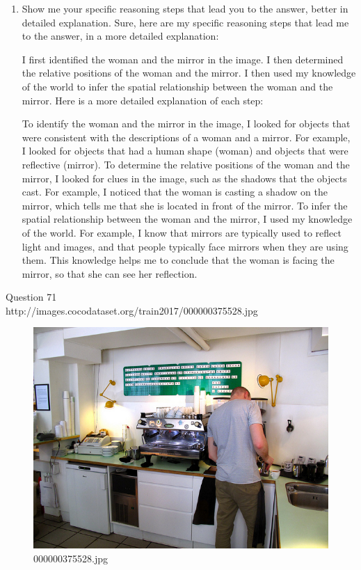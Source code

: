 \begin{enumerate}
    Here are some additional details about the spatial relationship between the woman and the mirror:
    
    The woman is a human being that is typically found in homes and public places.
    The mirror is a reflective surface that is used to reflect light and images.
    The woman is facing the mirror, meaning that she is looking at her own reflection.
    The mirror is behind the woman, meaning that it is located further away from the camera than the woman.
    Is there anything else you want me to help you with?
    \item Show me your specific reasoning steps that lead you to the answer, better in detailed explanation.
    \subitem 
    Sure, here are my specific reasoning steps that lead me to the answer, in a more detailed explanation:
    
    I first identified the woman and the mirror in the image.
    I then determined the relative positions of the woman and the mirror.
    I then used my knowledge of the world to infer the spatial relationship between the woman and the mirror.
    Here is a more detailed explanation of each step:
    
    To identify the woman and the mirror in the image, I looked for objects that were consistent with the descriptions of a woman and a mirror. For example, I looked for objects that had a human shape (woman) and objects that were reflective (mirror).
    To determine the relative positions of the woman and the mirror, I looked for clues in the image, such as the shadows that the objects cast. For example, I noticed that the woman is casting a shadow on the mirror, which tells me that she is located in front of the mirror.
    To infer the spatial relationship between the woman and the mirror, I used my knowledge of the world. For example, I know that mirrors are typically used to reflect light and images, and that people typically face mirrors when they are using them. This knowledge helps me to conclude that the woman is facing the mirror, so that she can see her reflection.
\end{enumerate}
Question 71\\
http://images.cocodataset.org/train2017/000000375528.jpg
\begin{figure}[h]
    \centering
    \includegraphics[width=0.8\linewidth]{../image set/hard/000000375528.jpg}
    \caption{000000375528.jpg}
\end{figure}
